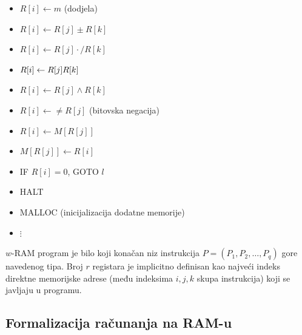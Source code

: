\begin{itemize}
	\item $R[i] \gets m$ (dodjela)
	\item $R[i] \gets R[j] \pm R[k]$
	\item $R[i] \gets R[j] \cdot/ R[k] $
	\item $R[i] \gets R[j] \/ R[k] $
	\item $R[i] \gets R[j] \wedge R[k]$
	\item $R[i] \gets \neq R[j] $ (bitovska negacija)
	\item $R[i] \gets M[R[j]]$
	\item $M[R[j]] \gets R[i]$
	\item IF $R[i] = 0$, GOTO $l$
	\item HALT
	\item MALLOC (inicijalizacija dodatne memorije)
	\item $\vdots$
\end{itemize}

\begin{definition}
   ${w}$-RAM program je bilo koji konačan niz instrukcija $P = (P_1, P_2,\ldots, P_q)$ gore navedenog tipa. Broj $r$ registara je implicitno definisan kao  najveći indeks direktne memorijske adrese (među indeksima $i, j, k$ skupa instrukcija) koji se javljaju u programu.
\end{definition}

\subsection{Formalizacija računanja na RAM-u}

